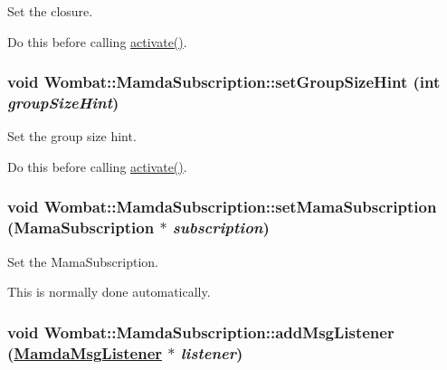 Set the closure. 

Do this before calling \hyperlink{classWombat_1_1MamdaSubscription_50f691571f680c77ad949f5c162afe35}{activate()}. \hypertarget{classWombat_1_1MamdaSubscription_78825f659fcd432b49285e6eead8f9dd}{
\subsubsection[setGroupSizeHint]{\setlength{\rightskip}{0pt plus 5cm}void Wombat::Mamda\-Subscription::set\-Group\-Size\-Hint (int {\em group\-Size\-Hint})}}
\label{classWombat_1_1MamdaSubscription_78825f659fcd432b49285e6eead8f9dd}


Set the group size hint. 

Do this before calling \hyperlink{classWombat_1_1MamdaSubscription_50f691571f680c77ad949f5c162afe35}{activate()}. \hypertarget{classWombat_1_1MamdaSubscription_d33d57b4dd870f3b7114af149ae1bb05}{
\subsubsection[setMamaSubscription]{\setlength{\rightskip}{0pt plus 5cm}void Wombat::Mamda\-Subscription::set\-Mama\-Subscription (Mama\-Subscription $\ast$ {\em subscription})}}
\label{classWombat_1_1MamdaSubscription_d33d57b4dd870f3b7114af149ae1bb05}


Set the Mama\-Subscription. 

This is normally done automatically. \hypertarget{classWombat_1_1MamdaSubscription_9149f71ae1f8be1f36075048be242155}{
\subsubsection[addMsgListener]{\setlength{\rightskip}{0pt plus 5cm}void Wombat::Mamda\-Subscription::add\-Msg\-Listener (\hyperlink{classWombat_1_1MamdaMsgListener}{Mamda\-Msg\-Listener} $\ast$ {\em listener})}}
\label{classWombat_1_1MamdaSubscription_9149f71ae1f8be1f36075048be242155}



